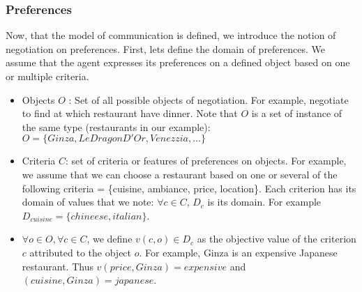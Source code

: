 \documentclass{llncs}
\begin{document}
\subsubsection{Preferences}
\par Now, that  the model of communication is defined, we introduce the notion of negotiation on preferences. First, lets define the domain of preferences. We assume that the agent expresses its preferences on a defined object based on one or multiple criteria.   
 \begin{itemize}
 \item Objects $O$ : Set of all possible objects of negotiation. For example, negotiate to find at which restaurant have dinner. Note that $O$ is a set of instance of the same type (restaurants in our example):
  \\ $O=\{Ginza, LeDragonD'Or,  Venezzia, \ldots\}$
 \item Criteria $C$: set of criteria or features of preferences on objects. For example, we assume that we can choose a restaurant based on one or several of the following criteria = \{cuisine, ambiance, price, location\}. Each criterion has its domain of values that we note: $\forall c \in C$, $D_{c}$ is its domain. For example $D_{cuisine} = \{chineese, italian\}$.

 \item $\forall o \in O, \forall c \in C$, we define $v(c,o) \in D_{c}$ as the objective value of the criterion $c$ attributed to the object $o$. For example, Ginza is an expensive Japanese restaurant. Thus $v(price, Ginza) = expensive$ and $(cuisine, Ginza) = japanese$. 
 

\end{itemize}
\end{document}
